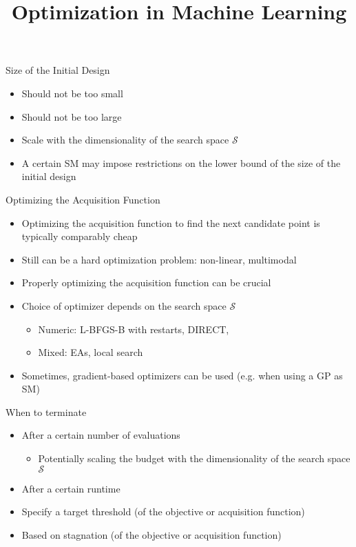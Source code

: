 \documentclass[11pt,compress,t,notes=noshow, xcolor=table]{beamer}
\title{Optimization in Machine Learning}
\date{}
\begin{document}
\begin{frame}{Size of the Initial Design}
  \begin{itemize}
    \item Should not be too small
    \item Should not be too large
    \item Scale with the dimensionality of the search space $\mathcal{S}$
    \item A certain SM may impose restrictions on the lower bound of the size of the initial design
  \end{itemize}
\end{frame}

\begin{frame}{Optimizing the Acquisition Function}
  \begin{itemize}
    \item Optimizing the acquisition function to find the next candidate point is typically comparably cheap
    \item Still can be a hard optimization problem: non-linear, multimodal
    \item Properly optimizing the acquisition function can be crucial
    \item Choice of optimizer depends on the search space $\mathcal{S}$
      \begin{itemize}
        \item Numeric: L-BFGS-B with restarts, DIRECT,
        \item Mixed: EAs, local search
      \end{itemize}
    \item Sometimes, gradient-based optimizers can be used (e.g. when using a GP as SM)
  \end{itemize}
\end{frame}

\begin{frame}{When to terminate}
  \begin{itemize}
    \item After a certain number of evaluations
      \begin{itemize}
        \item Potentially scaling the budget with the dimensionality of the search space $\mathcal{S}$
       \end{itemize}
    \item After a certain runtime
    \item Specify a target threshold (of the objective or acquisition function)
    \item Based on stagnation (of the objective or acquisition function)
  \end{itemize}
\end{frame}

\endlecture
\end{document}
